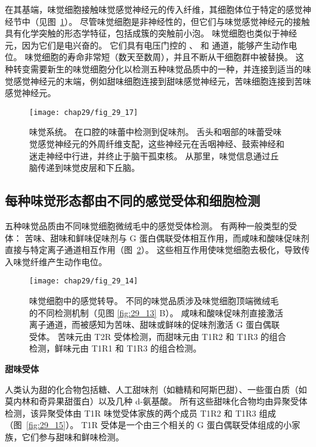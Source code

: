 在其基端，味觉细胞接触味觉感觉神经元的传入纤维，其细胞体位于特定的感觉神经节中（见图~\ref{fig:29_17}）。
尽管味觉细胞是非神经性的，但它们与味觉感觉神经元的接触具有化学突触的形态学特征，包括成簇的突触前小泡。
味觉细胞也类似于神经元，因为它们是电兴奋的。
它们具有电压门控的 、 和  通道，能够产生动作电位。
味觉细胞的寿命非常短（数天至数周），并且不断从干细胞群中被替换。
这种转变需要新生的味觉细胞分化以检测五种味觉品质中的一种，并连接到适当的味觉感觉神经元的末端，例如甜味细胞连接到甜味感觉神经元，苦味细胞连接到苦味感觉神经元。


\begin{figure}[htbp]
	\centering
	\texttt{[image: chap29/fig\_29\_17]}
	\caption{味觉系统。
		在口腔的味蕾中检测到促味剂。
		舌头和咽部的味蕾受味觉感觉神经元的外周纤维支配，这些神经元在舌咽神经、鼓索神经和迷走神经中行进，并终止于脑干孤束核。
		从那里，味觉信息通过丘脑传递到味觉皮层和下丘脑。}
	\label{fig:29_17}
\end{figure}



\subsection{每种味觉形态都由不同的感觉受体和细胞检测}

五种味觉品质由不同味觉细胞微绒毛中的感觉受体检测。 
有两种一般类型的受体：
苦味、甜味和鲜味促味剂与 G 蛋白偶联受体相互作用，而咸味和酸味促味剂直接与特定离子通道相互作用（图~\ref{fig:29_14}）。 
这些相互作用使味觉细胞去极化，导致传入味觉纤维产生动作电位。


\begin{figure}[htbp]
	\centering
	\texttt{[image: chap29/fig\_29\_14]}
	\caption{味觉细胞中的感觉转导。
		不同的味觉品质涉及味觉细胞顶端微绒毛的不同检测机制（见图 \ref{fig:29_13} B）。
		咸味和酸味促味剂直接激活离子通道，而被感知为苦味、甜味或鲜味的促味剂激活 G 蛋白偶联受体。 苦味元由 T2R 受体检测，而甜味元由 T1R2 和 T1R3 的组合检测，鲜味元由 T1R1 和 T1R3 的组合检测。}
	\label{fig:29_14}
\end{figure}


\textbf{甜味受体}

人类认为甜的化合物包括糖、人工甜味剂（如糖精和阿斯巴甜）、一些蛋白质（如莫内林和奇异果甜蛋白）以及几种 d-氨基酸。
所有这些甜味化合物均由异聚受体检测，该异聚受体由 T1R 味觉受体家族的两个成员 T1R2 和 T1R3 组成（图~\ref{fig:29_15}）。
T1R 受体是一个由三个相关的 G 蛋白偶联受体组成的小家族，它们参与甜味和鲜味检测。


